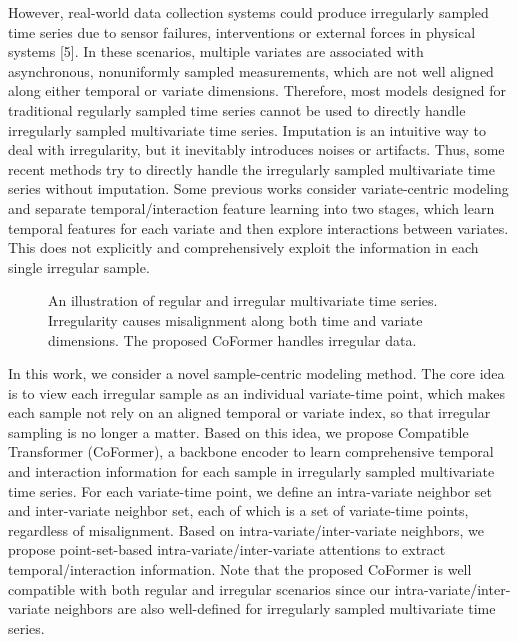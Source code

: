 \documentclass[twocolumn]{article}
\begin{document}
However, real-world data collection systems could produce irregularly sampled time series due to sensor failures, interventions or external forces in physical systems [5]. In these scenarios, multiple variates are associated with asynchronous, nonuniformly sampled measurements, which are not well aligned along either temporal or variate dimensions. Therefore, most models designed for traditional regularly sampled time series cannot be used to directly handle irregularly sampled multivariate time series. Imputation is an intuitive way to deal with irregularity, but it inevitably introduces noises or artifacts. Thus, some recent methods try to directly handle the irregularly sampled multivariate time series without imputation. Some previous works consider variate-centric modeling and separate temporal/interaction feature learning into two stages, which learn temporal features for each variate and then explore interactions between variates. This does not explicitly and comprehensively exploit the information in each single irregular sample.

\begin{figure}[t]
    \caption{An illustration of regular and irregular multivariate time series. Irregularity causes misalignment along both time and variate dimensions. The proposed CoFormer handles irregular data.}
    \label{fig:irregular_time_series}
\end{figure}

In this work, we consider a novel sample-centric modeling method. The core idea is to view each irregular sample as an individual variate-time point, which makes each sample not rely on an aligned temporal or variate index, so that irregular sampling is no longer a matter. Based on this idea, we propose Compatible Transformer (CoFormer), a backbone encoder to learn comprehensive temporal and interaction information for each sample in irregularly sampled multivariate time series. For each variate-time point, we define an intra-variate neighbor set and inter-variate neighbor set, each of which is a set of variate-time points, regardless of misalignment. Based on intra-variate/inter-variate neighbors, we propose point-set-based intra-variate/inter-variate attentions to extract temporal/interaction information. Note that the proposed CoFormer is well compatible with both regular and irregular scenarios since our intra-variate/inter-variate neighbors are also well-defined for irregularly sampled multivariate time series.
\end{document}
